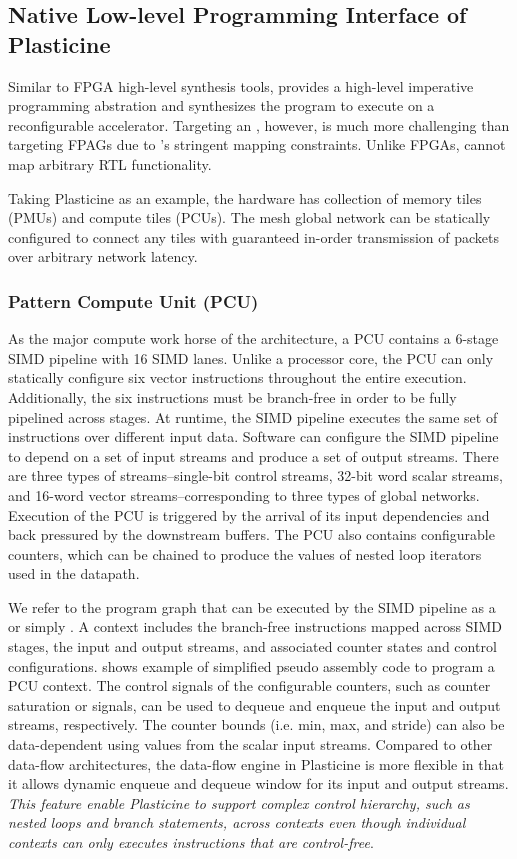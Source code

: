 \subsection{Native Low-level Programming Interface of Plasticine}
Similar to FPGA high-level synthesis tools, \name provides a high-level imperative programming abstration
and synthesizes the program to execute on a reconfigurable accelerator. Targeting an \rda, however,
is much more challenging than targeting FPAGs due to \rda's stringent mapping constraints. 
Unlike FPGAs, \rdas cannot map arbitrary RTL functionality. 

Taking Plasticine as an example, 
the hardware has collection of memory tiles (PMUs) and compute tiles (PCUs). 
The mesh global network can be statically configured to connect any tiles with guaranteed in-order 
transmission of packets over arbitrary network latency.

\subsubsection{Pattern Compute Unit (PCU)}
As the major compute work horse of the architecture, a PCU contains a 6-stage SIMD pipeline with 16 SIMD lanes. 
Unlike a processor core, the PCU can only statically configure six vector instructions throughout the
entire execution.
Additionally, the six instructions must be branch-free in order to be fully pipelined across stages.
At runtime, the SIMD pipeline executes the same set of instructions over different input data.
Software can configure the SIMD pipeline to depend on a set of input streams and
produce a set of output streams. 
There are three types of streams--single-bit control streams, 32-bit word scalar streams, and
16-word vector streams--corresponding to three types of global networks.
Execution of the PCU is triggered by the arrival of its input dependencies and back pressured by
the downstream buffers.
The PCU also contains configurable counters, which can be chained to produce the values of nested
loop iterators used in the datapath. 

We refer to the program graph that can be executed by the SIMD pipeline as a  or
simply . 
A context includes the branch-free instructions mapped across SIMD stages, the input and output 
streams, and associated counter states and control configurations.
\todo{} shows example of simplified pseudo assembly code to program a PCU context.
The control signals of the configurable counters, such as counter saturation or 
signals, can be used to dequeue and enqueue the input and output streams, respectively.
The counter bounds (i.e. min, max, and stride) can also be data-dependent using values from the 
scalar input streams. Compared to other data-flow architectures, the data-flow engine in Plasticine 
is more flexible in that it allows dynamic enqueue and dequeue window for its input and output streams.
\emph{This feature enable Plasticine to support complex control hierarchy, such as nested loops and
branch statements, across contexts even though individual contexts can only executes instructions that are
control-free}. 


